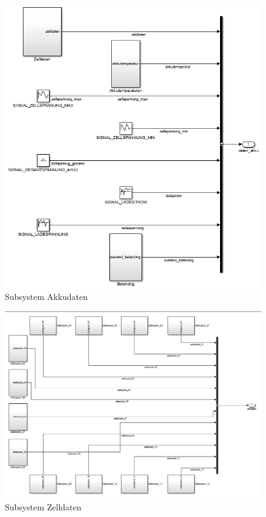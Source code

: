 \documentclass[fontsize = 12pt, paper = a4]{scrreprt}
\begin{document}
\begin{figure}[b]
\centering
\includegraphics[scale = 0.8]{akkudaten}
\caption[Subsystem Akkudaten]{Subsystem Akkudaten}
\end{figure} 

\newpage


\begin{figure}
\centering
\includegraphics[scale = 0.65]{zelldaten}
\caption[Subsystem Zelldaten]{Subsystem Zelldaten}
\end{figure} 
\end{document}
